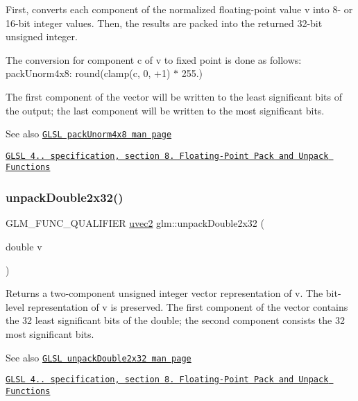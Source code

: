 First, converts each component of the normalized floating-\/point value v into 8-\/ or 16-\/bit integer values. Then, the results are packed into the returned 32-\/bit unsigned integer.

The conversion for component c of v to fixed point is done as follows\+: pack\+Unorm4x8\+: round(clamp(c, 0, +1) $\ast$ 255.)

The first component of the vector will be written to the least significant bits of the output; the last component will be written to the most significant bits.

\begin{DoxySeeAlso}{See also}
\href{http://www.opengl.org/sdk/docs/manglsl/xhtml/packUnorm4x8.xml}{\tt G\+L\+SL pack\+Unorm4x8 man page} 

\href{http://www.opengl.org/registry/doc/GLSLangSpec.4.20.8.pdf}{\tt G\+L\+SL 4.. specification, section 8. Floating-\/\+Point Pack and Unpack Functions} 
\end{DoxySeeAlso}
\mbox{\label{group__core__func__packing_gaea67aa4d065175e7746b2a8a2d00cedb}} 
\subsubsection{\texorpdfstring{unpack\+Double2x32()}{unpackDouble2x32()}}
{\footnotesize\ttfamily G\+L\+M\+\_\+\+F\+U\+N\+C\+\_\+\+Q\+U\+A\+L\+I\+F\+I\+ER \hyperlink{group__core__types_gafd2041b45eff671aa8899d2c2835eee9}{uvec2} glm\+::unpack\+Double2x32 (\begin{DoxyParamCaption}\item[{double}]{v }\end{DoxyParamCaption})}

Returns a two-\/component unsigned integer vector representation of v. The bit-\/level representation of v is preserved. The first component of the vector contains the 32 least significant bits of the double; the second component consists the 32 most significant bits.

\begin{DoxySeeAlso}{See also}
\href{http://www.opengl.org/sdk/docs/manglsl/xhtml/unpackDouble2x32.xml}{\tt G\+L\+SL unpack\+Double2x32 man page} 

\href{http://www.opengl.org/registry/doc/GLSLangSpec.4.20.8.pdf}{\tt G\+L\+SL 4.. specification, section 8. Floating-\/\+Point Pack and Unpack Functions} 
\end{DoxySeeAlso}
\mbox{\label{group__core__func__packing_ga90be544929ed83fa7039208bbab8c0ba}} 
